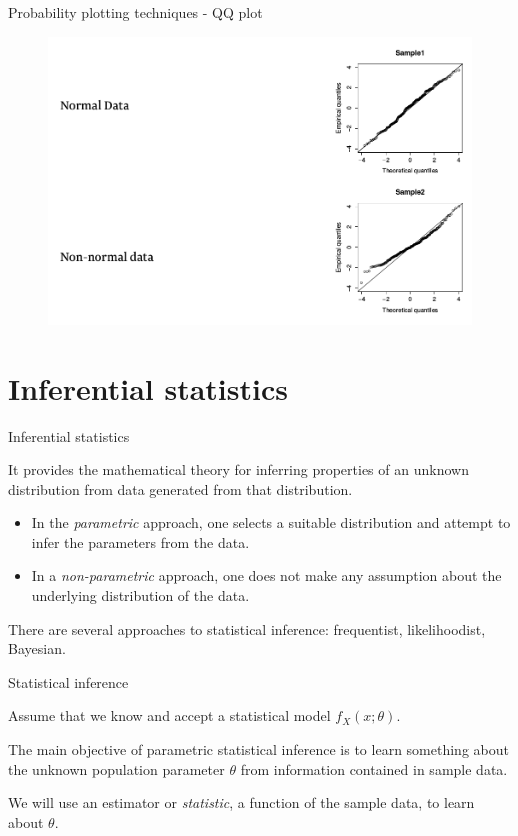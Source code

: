 \documentclass{beamer}
\begin{document}
\begin{frame}{Probability plotting techniques - QQ plot}

        \begin{figure}
                \includegraphics[width=0.8\linewidth]{qqplot.png}
        \end{figure}

\end{frame}

\section{Inferential statistics}

\begin{frame}{Inferential statistics}

        It provides the mathematical theory for inferring properties of an unknown distribution
        from data generated from that distribution.

        \begin{itemize}
                \item In the \textit{parametric} approach, one selects a suitable distribution and attempt to infer the parameters from the data.
                \item In a \textit{non-parametric} approach, one does not make any assumption about the underlying distribution of the data.
        \end{itemize}

        There are several approaches to statistical inference: frequentist, likelihoodist, Bayesian.

\end{frame}

\begin{frame}{Statistical inference}

	Assume that we know and accept a statistical model $f_X(x; \theta)$.

	\begin{block}{}
		The main objective of parametric statistical inference is to learn
		something about the unknown population parameter $\theta$ from
		information contained in sample data.
	\end{block}

	We will use an estimator or \textit{statistic}, a function of the sample data,  to
	learn about $\theta$.
	
\end{frame}
\end{document}
